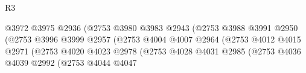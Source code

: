 \begin{lexlean}{R3}
\begin{coremodule}
                                                      @3972
                                                      @3975
                                                      @2936
                                                      (@2753
                                                        @3980
                                                        @3983
                                                        @2943
                                                        (@2753
                                                          @3988
                                                          @3991
                                                          @2950
                                                          (@2753
                                                            @3996
                                                            @3999
                                                            @2957
                                                            (@2753
                                                              @4004
                                                              @4007
                                                              @2964
                                                              (@2753
                                                                @4012
                                                                @4015
                                                                @2971
                                                                (@2753
                                                                  @4020
                                                                  @4023
                                                                  @2978
                                                                  (@2753
                                                                    @4028
                                                                    @4031
                                                                    @2985
                                                                    (@2753
                                                                      @4036
                                                                      @4039
                                                                      @2992
                                                                      (@2753
                                                                        @4044
                                                                        @4047

\end{coremodule}
\end{lexlean}
